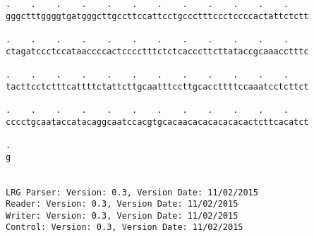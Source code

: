 \documentclass{article}
\begin{document}
\begin{Verbatim}
.    .    .    .    .    .    .    .    .    .    .    .    
gggctttggggtgatgggcttgccttccattcctgccctttccctccccactattctctt
                                                            
.    .    .    .    .    .    .    .    .    .    .    .    
ctagatccctccataaccccactcccctttctctcacccttcttataccgcaaacctttc
                                                            
.    .    .    .    .    .    .    .    .    .    .    .    
tacttcctctttcattttctattcttgcaatttccttgcaccttttccaaatcctcttct
                                                            
.    .    .    .    .    .    .    .    .    .    .    .    
cccctgcaataccatacaggcaatccacgtgcacaacacacacacacactcttcacatct
                                                            
.
g
 
 
LRG Parser: Version: 0.3, Version Date: 11/02/2015
Reader: Version: 0.3, Version Date: 11/02/2015
Writer: Version: 0.3, Version Date: 11/02/2015
Control: Version: 0.3, Version Date: 11/02/2015
\end{Verbatim}
\end{document}
